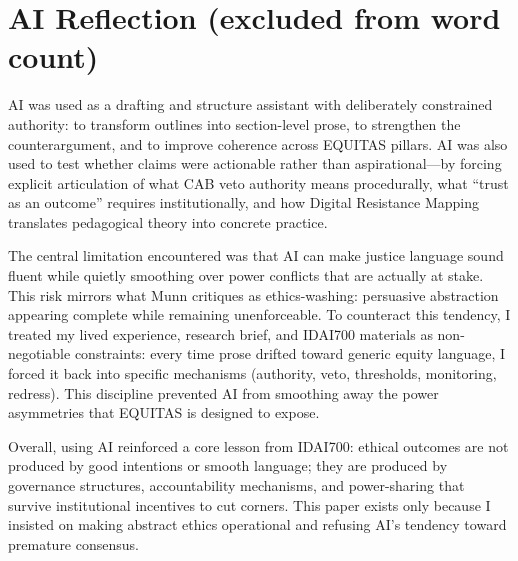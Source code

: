 \documentclass[12pt,a4paper]{article}
\begin{document}
\section*{AI Reflection (excluded from word count)}

AI was used as a drafting and structure assistant with deliberately constrained authority: to transform outlines into section-level prose, to strengthen the counterargument, and to improve coherence across EQUITAS pillars. AI was also used to test whether claims were actionable rather than aspirational—by forcing explicit articulation of what CAB veto authority means procedurally, what ``trust as an outcome'' requires institutionally, and how Digital Resistance Mapping translates pedagogical theory into concrete practice.\cite{garcia_ed415}

The central limitation encountered was that AI can make justice language sound fluent while quietly smoothing over power conflicts that are actually at stake. This risk mirrors what Munn critiques as ethics-washing: persuasive abstraction appearing complete while remaining unenforceable.\cite{munn_idai700} To counteract this tendency, I treated my lived experience, research brief, and IDAI700 materials as non-negotiable constraints: every time prose drifted toward generic equity language, I forced it back into specific mechanisms (authority, veto, thresholds, monitoring, redress). This discipline prevented AI from smoothing away the power asymmetries that EQUITAS is designed to expose.\cite{garcia_ed415}

Overall, using AI reinforced a core lesson from IDAI700: ethical outcomes are not produced by good intentions or smooth language; they are produced by governance structures, accountability mechanisms, and power-sharing that survive institutional incentives to cut corners.\cite{munn_idai700} This paper exists only because I insisted on making abstract ethics operational and refusing AI's tendency toward premature consensus.
\end{document}
